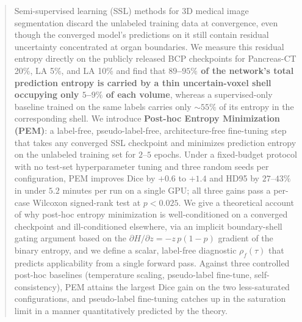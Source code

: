 \begin{abstract}
Semi-supervised learning (SSL) methods for 3D medical image segmentation discard the unlabeled training data at convergence, even though the converged model's predictions on it still contain residual uncertainty concentrated at organ boundaries. We measure this residual entropy directly on the publicly released BCP checkpoints for Pancreas-CT 20\%, LA 5\%, and LA 10\% and find that \textbf{$89$--$95\%$ of the network's total prediction entropy is carried by a thin uncertain-voxel shell occupying only $5$--$9\%$ of each volume}, whereas a supervised-only baseline trained on the same labels carries only $\sim\!55\%$ of its entropy in the corresponding shell. We introduce \textbf{Post-hoc Entropy Minimization (PEM)}: a label-free, pseudo-label-free, architecture-free fine-tuning step that takes any converged SSL checkpoint and minimizes prediction entropy on the unlabeled training set for $2$--$5$ epochs. Under a fixed-budget protocol with no test-set hyperparameter tuning and three random seeds per configuration, PEM improves Dice by $+0.6$ to $+1.4$ and HD95 by $27$--$43\%$ in under $5.2$ minutes per run on a single GPU; all three gains pass a per-case Wilcoxon signed-rank test at $p<0.025$. We give a theoretical account of why post-hoc entropy minimization is well-conditioned on a converged checkpoint and ill-conditioned elsewhere, via an implicit boundary-shell gating argument based on the $\partial H/\partial z=-z\,p(1{-}p)$ gradient of the binary entropy, and we define a scalar, label-free diagnostic $\rho_f(\tau)$ that predicts applicability from a single forward pass. Against three controlled post-hoc baselines (temperature scaling, pseudo-label fine-tune, self-consistency), PEM attains the largest Dice gain on the two less-saturated configurations, and pseudo-label fine-tuning catches up in the saturation limit in a manner quantitatively predicted by the theory.
\end{abstract}
